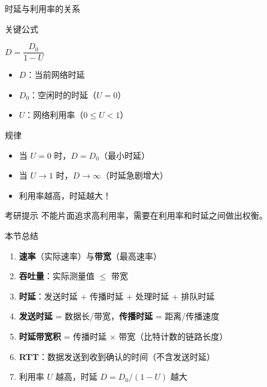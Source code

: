 \documentclass[10pt, aspectratio=169]{beamer}
\begin{document}
\begin{frame}{时延与利用率的关系}
    \begin{block}{关键公式}
        \begin{center}
            \Large
            $D = \dfrac{D_0}{1 - U}$
        \end{center}
    \end{block}
    \vspace{0.3em}
    \begin{itemize}
        \item $D$：当前网络时延
        \item $D_0$：空闲时的时延（$U=0$）
        \item $U$：网络利用率（$0 \le U < 1$）
    \end{itemize}
    \vspace{0.5em}
    \begin{exampleblock}{规律}
        \begin{itemize}
            \item 当 $U=0$ 时，$D=D_0$（最小时延）
            \item 当 $U\to 1$ 时，$D\to \infty$（时延急剧增大）
            \item 利用率越高，时延越大！
        \end{itemize}
    \end{exampleblock}
    \vspace{0.3em}
    \begin{block}{考研提示}
        不能片面追求高利用率，需要在利用率和时延之间做出权衡。
    \end{block}
\end{frame}

\begin{frame}{本节总结}
    \begin{enumerate}
        \item \textbf{速率}（实际速率）与\textbf{带宽}（最高速率）
        \item \textbf{吞吐量}：实际测量值 $\le$ 带宽
        \item \textbf{时延}：发送时延 + 传播时延 + 处理时延 + 排队时延
        \item \textbf{发送时延} = 数据长/带宽，\textbf{传播时延} = 距离/传播速度
        \item \textbf{时延带宽积} = 传播时延 $\times$ 带宽（比特计数的链路长度）
        \item \textbf{RTT}：数据发送到收到确认的时间（不含发送时延）
        \item 利用率 $U$ 越高，时延 $D = D_0/(1-U)$ 越大
    \end{enumerate}
\end{frame}
\end{document}
